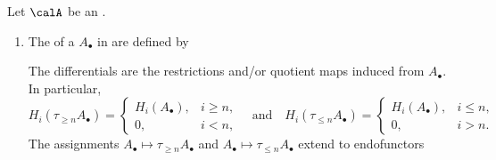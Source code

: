 \begin{definition} \label{definition:canonical_truncation_of_chain_complexes_of_objects_in_an_abelian_category}

    Let $\calA$ be an .

    \begin{enumerate}
        \item  
    The  of a 
    $A_\bullet$ in 
    are defined by


    The differentials are the restrictions and/or quotient maps induced from $A_\bullet$. 
    In particular,
    $$
    H_i(\tau_{\ge n} A_\bullet) = 
    \begin{cases}
        H_i(A_\bullet), & i \ge n, \\
        0, & i < n,
    \end{cases}
    \quad\text{and}\quad
    H_i(\tau_{\le n} A_\bullet) = 
    \begin{cases}
        H_i(A_\bullet), & i \le n, \\
        0, & i > n.
    \end{cases}
    $$
    The assignments $A_\bullet \mapsto \tau_{\ge n} A_\bullet$ and $A_\bullet \mapsto \tau_{\le n} A_\bullet$ extend to endofunctors



\end{enumerate}
\end{definition}
